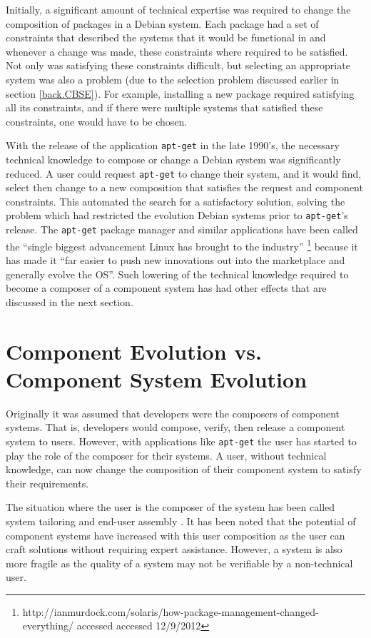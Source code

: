 Initially, a significant amount of technical expertise was required to change the composition of packages in a Debian system.
Each package had a set of constraints that described the systems that it would be functional in
and whenever a change was made, 
these constraints where required to be satisfied.  
Not only was satisfying these constraints difficult, but selecting an appropriate system was also a problem (due to the selection problem discussed earlier in section \ref{back.CBSE}).
For example, installing a new package required satisfying all its constraints, and if there were multiple systems that satisfied these constraints, one would have to be chosen.

With the release of the application \texttt{apt-get} in the late 1990's, the necessary technical knowledge to compose or change a Debian system was significantly reduced.
A user could request \texttt{apt-get} to change their system, and it would find, select then change to a new composition that satisfies the request and component constraints.
This automated the search for a satisfactory solution, solving the problem which had restricted the evolution Debian systems prior to \texttt{apt-get}'s release.
The \texttt{apt-get} package manager and similar applications have been called the ``single biggest advancement Linux has brought to the industry'' 
\footnote{http://ianmurdock.com/solaris/how-package-management-changed-everything/ accessed accessed 12/9/2012} 
because it has made it ``far easier to push new innovations out into the marketplace and generally evolve the OS''.
Such lowering of the technical knowledge required to become a composer of a component system has had other effects that are discussed in the next section.

\section{Component Evolution vs. Component System Evolution}
\label{background.componentsystemevolution}
Originally it was assumed that developers were the composers \citep{Parnas1972,PrietoDiaz1987} of component systems.
That is, developers would compose, verify, then release a component system to users.
However, with applications like \texttt{apt-get} the user has started to play the role of the composer for their systems.
A user, without technical knowledge, can now change the composition of their component system to satisfy their requirements.

The situation where the user is the composer of the system has been called system tailoring \citep{Morch1997} and end-user assembly \citep{Szyperski2002}. 
It has been noted that the potential of component systems have increased with this user composition \citep{Szyperski2002} as the user can craft solutions without requiring expert assistance.
However, a system is also more fragile as the quality of a system may not be verifiable by a non-technical user.

